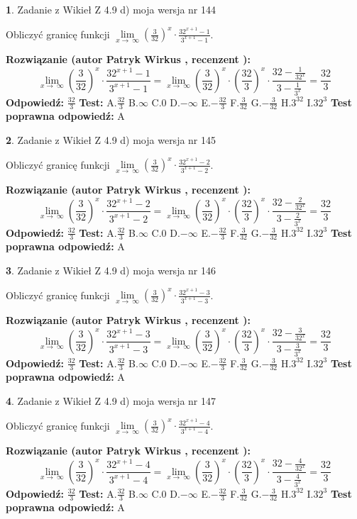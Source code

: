 \documentclass[12pt, a4paper]{article}
\theoremstyle{definition} %
\newtheorem{zad}{}
\newcommand{\zadStart}[1]{\begin{zad}#1\newline}
\newcommand{\zadStop}{\end{zad}}
\newcommand{\rozwStart}[2]{\noindent \textbf{Rozwiązanie (autor #1 , recenzent #2): }\newline}
\newcommand{\rozwStop}{\newline}
\newcommand{\odpStart}{\noindent \textbf{Odpowiedź:}\newline}
\newcommand{\odpStop}{\newline}
\newcommand{\testStart}{\noindent \textbf{Test:}\newline}
\newcommand{\testStop}{\newline}
\newcommand{\kluczStart}{\noindent \textbf{Test poprawna odpowiedź:}\newline}
\newcommand{\kluczStop}{\newline}
\begin{document}
\zadStart{Zadanie z Wikieł Z 4.9 d) moja wersja nr 144}


Obliczyć granicę funkcji  $\lim\limits_{x\to\ \infty}(\frac{3}{32})^{x}\cdot\frac{32^{x+1}-1}{3^{x+1}-1}$.
\zadStop
\rozwStart{Patryk Wirkus}{}
$$\lim\limits_{x\to\ \infty}(\frac{3}{32})^{x}\cdot\frac{32^{x+1}-1}{3^{x+1}-1}=\lim\limits_{x\to\ \infty}(\frac{3}{32})^{x}\cdot(\frac{32}{3})^{x} \cdot \frac{32-\frac{1}{32^{x}}}{3-\frac{1}{3^{x}}} = \frac{32}{3}$$
\rozwStop
\odpStart
$\frac{32}{3}$
\odpStop
\testStart
A.$\frac{32}{3}$ B.$\infty$ C.$0$ D.$-\infty$ E.$-\frac{32}{3}$
F.$\frac{3}{32}$ G.$-\frac{3}{32}$
H.$3^{32}$
I.$32^{3}$
\testStop
\kluczStart
A
\kluczStop



\zadStart{Zadanie z Wikieł Z 4.9 d) moja wersja nr 145}


Obliczyć granicę funkcji  $\lim\limits_{x\to\ \infty}(\frac{3}{32})^{x}\cdot\frac{32^{x+1}-2}{3^{x+1}-2}$.
\zadStop
\rozwStart{Patryk Wirkus}{}
$$\lim\limits_{x\to\ \infty}(\frac{3}{32})^{x}\cdot\frac{32^{x+1}-2}{3^{x+1}-2}=\lim\limits_{x\to\ \infty}(\frac{3}{32})^{x}\cdot(\frac{32}{3})^{x} \cdot \frac{32-\frac{2}{32^{x}}}{3-\frac{2}{3^{x}}} = \frac{32}{3}$$
\rozwStop
\odpStart
$\frac{32}{3}$
\odpStop
\testStart
A.$\frac{32}{3}$ B.$\infty$ C.$0$ D.$-\infty$ E.$-\frac{32}{3}$
F.$\frac{3}{32}$ G.$-\frac{3}{32}$
H.$3^{32}$
I.$32^{3}$
\testStop
\kluczStart
A
\kluczStop



\zadStart{Zadanie z Wikieł Z 4.9 d) moja wersja nr 146}


Obliczyć granicę funkcji  $\lim\limits_{x\to\ \infty}(\frac{3}{32})^{x}\cdot\frac{32^{x+1}-3}{3^{x+1}-3}$.
\zadStop
\rozwStart{Patryk Wirkus}{}
$$\lim\limits_{x\to\ \infty}(\frac{3}{32})^{x}\cdot\frac{32^{x+1}-3}{3^{x+1}-3}=\lim\limits_{x\to\ \infty}(\frac{3}{32})^{x}\cdot(\frac{32}{3})^{x} \cdot \frac{32-\frac{3}{32^{x}}}{3-\frac{3}{3^{x}}} = \frac{32}{3}$$
\rozwStop
\odpStart
$\frac{32}{3}$
\odpStop
\testStart
A.$\frac{32}{3}$ B.$\infty$ C.$0$ D.$-\infty$ E.$-\frac{32}{3}$
F.$\frac{3}{32}$ G.$-\frac{3}{32}$
H.$3^{32}$
I.$32^{3}$
\testStop
\kluczStart
A
\kluczStop



\zadStart{Zadanie z Wikieł Z 4.9 d) moja wersja nr 147}


Obliczyć granicę funkcji  $\lim\limits_{x\to\ \infty}(\frac{3}{32})^{x}\cdot\frac{32^{x+1}-4}{3^{x+1}-4}$.
\zadStop
\rozwStart{Patryk Wirkus}{}
$$\lim\limits_{x\to\ \infty}(\frac{3}{32})^{x}\cdot\frac{32^{x+1}-4}{3^{x+1}-4}=\lim\limits_{x\to\ \infty}(\frac{3}{32})^{x}\cdot(\frac{32}{3})^{x} \cdot \frac{32-\frac{4}{32^{x}}}{3-\frac{4}{3^{x}}} = \frac{32}{3}$$
\rozwStop
\odpStart
$\frac{32}{3}$
\odpStop
\testStart
A.$\frac{32}{3}$ B.$\infty$ C.$0$ D.$-\infty$ E.$-\frac{32}{3}$
F.$\frac{3}{32}$ G.$-\frac{3}{32}$
H.$3^{32}$
I.$32^{3}$
\testStop
\kluczStart
A
\kluczStop
\end{document}

